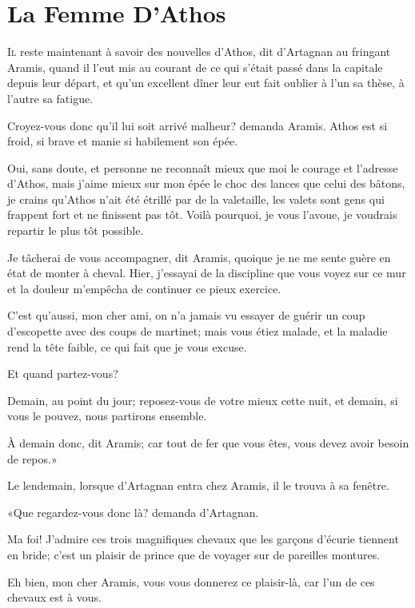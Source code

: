 
\chapter{La Femme D'Athos} 
	\lettrine[ante=«]{I}{l} reste maintenant à savoir des nouvelles d'Athos, dit d'Artagnan au fringant Aramis, quand il l'eut mis au courant de ce qui s'était passé dans la capitale depuis leur départ, et qu'un excellent dîner leur eut fait oublier à l'un sa thèse, à l'autre sa fatigue. 

\speak  Croyez-vous donc qu'il lui soit arrivé malheur? demanda Aramis. Athos est si froid, si brave et manie si habilement son épée. 

\speak  Oui, sans doute, et personne ne reconnaît mieux que moi le courage et l'adresse d'Athos, mais j'aime mieux sur mon épée le choc des lances que celui des bâtons, je crains qu'Athos n'ait été étrillé par de la valetaille, les valets sont gens qui frappent fort et ne finissent pas tôt. Voilà pourquoi, je vous l'avoue, je voudrais repartir le plus tôt possible. 

\speak  Je tâcherai de vous accompagner, dit Aramis, quoique je ne me sente guère en état de monter à cheval. Hier, j'essayai de la discipline que vous voyez sur ce mur et la douleur m'empêcha de continuer ce pieux exercice. 

\speak  C'est qu'aussi, mon cher ami, on n'a jamais vu essayer de guérir un coup d'escopette avec des coups de martinet; mais vous étiez malade, et la maladie rend la tête faible, ce qui fait que je vous excuse. 

\speak  Et quand partez-vous? 

\speak  Demain, au point du jour; reposez-vous de votre mieux cette nuit, et demain, si vous le pouvez, nous partirons ensemble. 

\speak  À demain donc, dit Aramis; car tout de fer que vous êtes, vous devez avoir besoin de repos.» 

Le lendemain, lorsque d'Artagnan entra chez Aramis, il le trouva à sa fenêtre. 

«Que regardez-vous donc là? demanda d'Artagnan. 

\speak  Ma foi! J'admire ces trois magnifiques chevaux que les garçons d'écurie tiennent en bride; c'est un plaisir de prince que de voyager sur de pareilles montures. 

\speak  Eh bien, mon cher Aramis, vous vous donnerez ce plaisir-là, car l'un de ces chevaux est à vous. 


